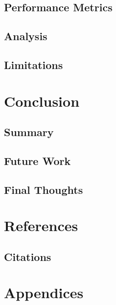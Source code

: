 \documentclass[12pt,oneside,a4paper]{article}
\begin{document}
\subsection{Performance Metrics}

\subsection{Analysis}

\subsection{Limitations}


\section{Conclusion} 

\subsection{Summary}

\subsection{Future Work}

\subsection{Final Thoughts}


\section{References} 

\subsection{Citations}


\section{Appendices}


\end{document}
